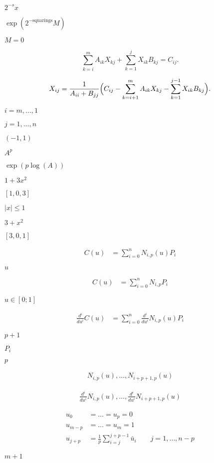 \documentclass{article}
\begin{document}
$ 2^{-s} x $
\pagebreak

$ \exp(2^{-\mbox{squarings}}M) $
\pagebreak

$ M = 0 $
\pagebreak

\[
    \sum_{k=i}^m A_{ik} X_{kj} + \sum_{k=1}^j X_{ik} B_{kj} = C_{ij}.
\]
\pagebreak

\[
    X_{ij} = \frac{1}{A_{ii} + B_{jj}} \Bigl( C_{ij}
    - \sum_{k=i+1}^m A_{ik} X_{kj} - \sum_{k=1}^{j-1} X_{ik} B_{kj} \Bigr).
\]
\pagebreak

$ i=m,\ldots,1 $
\pagebreak

$ j=1,\ldots,n $
\pagebreak

$ (-1, 1) $
\pagebreak

$ A^p $
\pagebreak

$
\exp(p \log(A)) $
\pagebreak

$ 1 + 3x^2 $
\pagebreak

$ [ 1, 0, 3 ] $
\pagebreak

$ |x| \le 1 $
\pagebreak

$ 3 + x^2 $
\pagebreak

$ [ 3, 0, 1 ] $
\pagebreak

\begin{align*}
  C(u) & = \sum_{i=0}^{n}N_{i,p}(u)P_i
\end{align*}
\pagebreak

$u$
\pagebreak

\begin{align*}
  C(u) & = \sum_{i=0}^{n}N_{i,p}P_i
\end{align*}
\pagebreak

$u \in [0;1]$
\pagebreak

\begin{align*}
  \frac{d^i}{du^i}C(u) & = \sum_{i=0}^{n} \frac{d^i}{du^i} N_{i,p}(u)P_i
\end{align*}
\pagebreak

$p+1$
\pagebreak

$P_i$
\pagebreak

$p$
\pagebreak

\begin{align*}
  N_{i,p}(u), \hdots, N_{i+p+1,p}(u)
\end{align*}
\pagebreak

\begin{align*}
  \frac{d^i}{du^i} N_{i,p}(u), \hdots, \frac{d^i}{du^i} N_{i+p+1,p}(u)
\end{align*}
\pagebreak

\begin{align*}
 u_0 & = \hdots = u_p = 0 \\
 u_{m-p} & = \hdots = u_{m} = 1 \\
 u_{j+p} & = \frac{1}{p}\sum_{i=j}^{j+p-1}\bar{u}_i \quad\quad j=1,\hdots,n-p
\end{align*}
\pagebreak

$m+1$
\pagebreak
\end{document}
